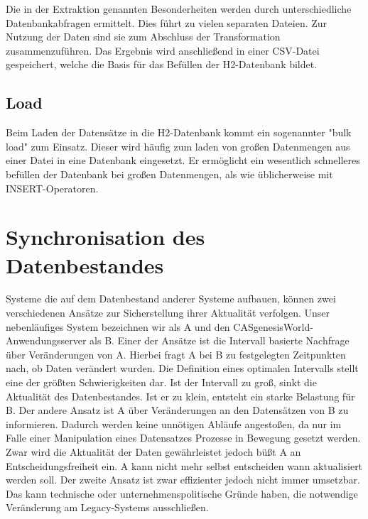 Die in der Extraktion genannten Besonderheiten werden durch unterschiedliche Datenbankabfragen ermittelt. Dies führt zu vielen separaten Dateien. Zur Nutzung der Daten sind sie zum Abschluss der Transformation zusammenzuführen. Das Ergebnis wird anschließend in einer CSV-Datei gespeichert, welche die Basis für das Befüllen der H2-Datenbank bildet. 

\subsection{Load}

Beim Laden der Datensätze in die H2-Datenbank kommt ein sogenannter "bulk load" zum Einsatz. Dieser wird häufig zum laden von großen Datenmengen aus einer Datei in eine Datenbank eingesetzt. Er ermöglicht ein wesentlich schnelleres befüllen der Datenbank bei großen Datenmengen, als wie üblicherweise mit INSERT-Operatoren.

\section{Synchronisation des Datenbestandes}
\label{ch:Konzeption:sec:updatedatenbestand}

Systeme die auf dem Datenbestand anderer Systeme aufbauen, können zwei verschiedenen Ansätze zur Sicherstellung ihrer Aktualität verfolgen. Unser nebenläufiges System bezeichnen wir als A und den CASgenesisWorld-Anwendungsserver als B. Einer der Ansätze ist die Intervall basierte Nachfrage über Veränderungen von A. Hierbei fragt A bei B zu festgelegten Zeitpunkten nach, ob Daten verändert wurden. Die Definition eines optimalen Intervalls stellt eine der größten Schwierigkeiten dar. Ist der Intervall zu groß, sinkt die Aktualität des Datenbestandes. Ist er zu klein, entsteht  ein starke Belastung für B. Der andere Ansatz ist A über Veränderungen an den Datensätzen von B zu informieren. Dadurch werden keine unnötigen Abläufe angestoßen, da nur im Falle einer Manipulation eines Datensatzes Prozesse in Bewegung gesetzt werden. Zwar wird die Aktualität der Daten gewährleistet jedoch büßt A an Entscheidungsfreiheit ein. A kann nicht mehr selbst entscheiden wann aktualisiert werden soll. Der zweite Ansatz ist zwar effizienter jedoch nicht immer umsetzbar. Das kann technische oder unternehmenspolitische Gründe haben, die notwendige Veränderung am Legacy-Systems ausschließen.  

